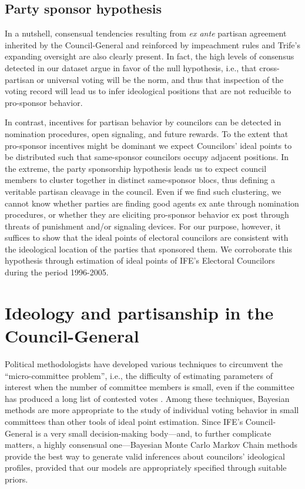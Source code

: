 \documentclass[12 pt, letter]{article}
\begin{document}
\subsection{Party sponsor hypothesis}
In a nutshell, consensual tendencies resulting from \emph{ex ante}
partisan agreement inherited by the Council-General and reinforced
by impeachment rules and {\sc Trife}'s expanding oversight are also
clearly present.  In fact, the high levels of consensus detected in
our dataset argue in favor of the null hypothesis, i.e., that
cross-partisan or universal voting will be the norm, and thus that
inspection of the voting record will lead us to infer ideological
positions that are not reducible to pro-sponsor behavior.

In contrast, incentives for partisan behavior by councilors can be
detected in nomination procedures, open signaling, and future
rewards.  To the extent that pro-sponsor incentives might be
dominant we expect Councilors' ideal points to be distributed such
that same-sponsor councilors occupy adjacent positions.  In the
extreme, the party sponsorship hypothesis leads us to expect council
members to cluster together in distinct same-sponsor blocs, thus
defining a veritable partisan cleavage in the council.  Even if we
find such clustering, we cannot know whether parties are finding
good agents ex ante through nomination procedures, or whether they
are eliciting pro-sponsor behavior ex post through threats of
punishment and/or signaling devices.  For our purpose, however, it
suffices to show that the ideal points of electoral councilors are
consistent with the ideological location of the parties that
sponsored them.  We corroborate this hypothesis through estimation
of ideal points of IFE's Electoral Councilors during the period
1996-2005.

\singlespacing
\section{Ideology and partisanship in the Council-General}\label{S:estimation}
\doublespacing Political methodologists have developed various techniques to circumvent the ``micro-committee problem'', i.e., the difficulty of estimating parameters of interest when the number of committee members is small, even if the committee has produced a long list of contested votes \citep{Londregan2000}.  Among these techniques, Bayesian methods \citep{Martin2002, Clinton2004, Jackman2001} are more appropriate to the study of individual voting behavior in small committees than other tools of ideal point estimation.  Since IFE's Council-General is a very small decision-making body---and, to further complicate matters, a highly consensual one---Bayesian Monte Carlo Markov Chain methods provide the best way to generate valid inferences about councilors' ideological profiles, provided that our models are appropriately specified through suitable priors.
\end{document}
